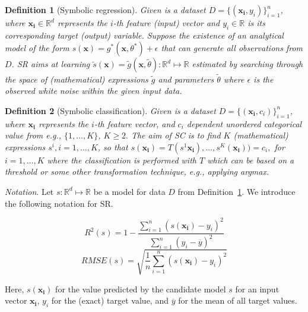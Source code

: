 \documentclass{bmcart}
\newtheorem{definition}{Definition}
\begin{document}
\begin{definition}[Symbolic regression]\label{dfn:sr}
	Given is a dataset $D = \{(\mathbf{x_i}, y_i)\}_{i=1}^n$, where $\mathbf{x_i} \in \mathbb{R}^d$ represents the $i$-th feature (input) vector and $y_i \in \mathbb{R}$ is its corresponding target (output) variable. Suppose the existence of an analytical model of the form $s(\mathbf{x})= g^*(\mathbf{x}, \theta^*) + \epsilon $ that can generate  all observations from $D$.  
	SR aims at learning $\tilde{s}(\mathbf{x})=  \tilde{g}(\mathbf{x}, \tilde{\theta})  \colon \mathbb{R}^d \mapsto \mathbb{R}$  estimated by searching through the space of (mathematical) expressions  $\tilde{g}$ and parameters $\tilde{\theta}$ where  $\epsilon$ is the observed white noise within the given input data. 
	
\end{definition}


\begin{definition}[Symbolic classification]\label{dfn:sc}
	Given is a dataset $D = \{(\mathbf{x_i}, c_i)\}_{i=1}^n$, where $\mathbf{x_i}$ represents the $i$-th feature vector, and $c_i$  dependent unordered categorical
	 value from e.g., $\{1, \ldots, K  \} $, $K\geq 2. $ The aim of SC is to find $K$ (mathematical) expressions $s^i, i=1, \ldots, K$, so that $s(\mathbf{x_i}) = T( s^1\mathbf{x_i}), \ldots, s^K(\mathbf{x_i})  ) = c_i,$ for $i=1, \ldots, K$ where the classification is performed with $T$ which can be based on a threshold  or some other transformation technique, e.g., applying \textrm{argmax}. 
  \end{definition}
 
 
\emph{Notation}. Let $s \colon \mathbb{R}^d \mapsto \mathbb{R}$ be a model for data $D$ from Definition~\ref{dfn:sr}.  We introduce the following notation for SR. 
 
\begin{equation}
		R^2(s) = 1- \frac{ \sum_{i=1}^{n} \left( s(\mathbf{x_i}) - y_i \right)^2  }{ \sum_{i=1}^{n} \left( y_{i}  - \overline{y} \right)^2  }
	\end{equation}
	\begin{equation}
		RMSE(s) = \sqrt {\frac{1}{n} \sum_{i=1}^{n} (s(\mathbf{x_i}) - y_{i})^2}
	\end{equation}
	
 Here, $s(\mathbf{x_i})$ for the value predicted by the candidate model $s$ for an input vector $\mathbf{x_i}$, $y_{i}$ for the (exact) target value, and $\overline{y}$ for the mean of all target values.
 
\end{document}
